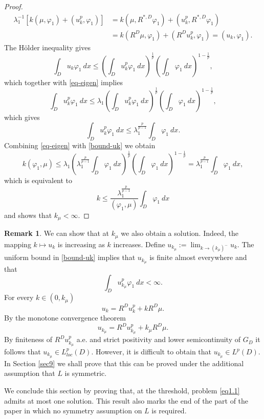 \documentclass[11pt,a4paper,reqno]{amsart}
\theoremstyle{definition}
\newtheorem{remark}[theorem]{Remark}
\numberwithin{equation}{section}
\begin{document}
\begin{proof}
\begin{equation}
\begin{split}
\lambda_1^{-1}[k(\mu,\varphi_1)+(u_k^p,\varphi_1)]&=k(\mu,R^{*,D}\varphi_1)+(u_k^p,R^{*,D}\varphi_1)\\&
= k(R^D\mu,\varphi_1)+(R^Du_k^p,\varphi_1)=(u_k,\varphi_1).
\end{split}
\end{equation}
The H\"older inequality gives
\[
\int_D u_k\varphi_1\ dx\le \left(\int_D u_k^p\varphi_1\ dx\right)^{\frac{1}{p}}\left(\int_D \varphi_1\ dx\right)^{1-\frac{1}{p}},
\]
which together with \eqref{eq-eigen} implies
\[
\int_D u_k^p\varphi_1\ dx\leq \lambda_1 \left(\int_D u_k^p\varphi_1\ dx\right)^{\frac{1}{p}}\left(\int_D \varphi_1\ dx\right)^{1-\frac{1}{p}},
\]
which gives 
\begin{equation}\label{bound-uk}
\int_D u_k^p\varphi_1\ dx\leq \lambda_1^{\frac{p}{p-1}}\int_D \varphi_1\ dx.
\end{equation}
Combining \eqref{eq-eigen} with \eqref{bound-uk} we obtain
\[
k(\varphi_1,\mu)\leq \lambda_1 \left(\lambda_1^{\frac{p}{p-1}}\int_D \varphi_1\ dx\right)^{\frac{1}{p}}\left(\int_D \varphi_1\ dx\right)^{1-\frac{1}{p}}=\lambda_1^{\frac{p}{p-1}}\int_D \varphi_1\ dx,
\]
which  is equivalent to
\[
k\leq \frac{\lambda_1^{\frac{p}{p-1}}}{(\varphi_1,\mu)}\int_D \varphi_1\ dx
\]
and shows that $k_\mu<\infty$. 
\end{proof}

\begin{remark}
\label{rem.critex}
We can show that at $k_\mu$  we also obtain a solution. 
Indeed,  the mapping $k\mapsto u_k$ is increasing as  $k$ increases.
 Define $u_{k_\mu}:=\lim_{k\to (k_\mu)^-}u_k$. 
The uniform bound in \eqref{bound-uk} implies that $u_{k_\mu}$
 is finite almost everywhere and that 
\begin{equation}\label{uk-star-bound}
\int_D u_{k_\mu}^p\varphi_1\ dx<\infty.
\end{equation}
For every $k\in (0,k_\mu)$
\[
u_k=R^Du_k^p+kR^D\mu.
\]
By the monotone convergence theorem
\[
u_{k_\mu}=R^Du_{k_\mu}^p+k_\mu R^D\mu.
\]
By finiteness of $R^Du_{k_\mu}^p$ a.e. and strict positivity and lower semicontinuity of $G_D$
it follows that $u_{k_\mu}\in L^p_{loc}(D)$.
However, it is difficult to obtain that $u_{k_\mu}\in L^p(D)$. In Section \ref{sec9} we shall prove that 
this can be proved under the additional assumption that
 $L$ is symmetric.
\end{remark}


We conclude this section by proving that, at the threshold, problem
\eqref{eq1.1} admits at most one solution. This result also marks the end
of the part of the paper in which no symmetry assumption on $L$ is
required.
\end{document}
